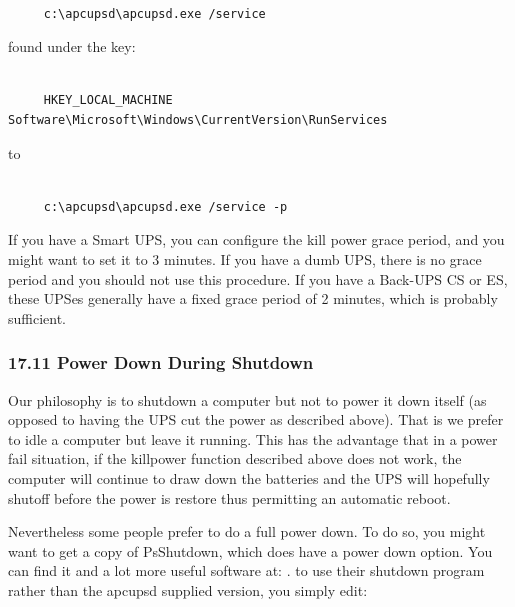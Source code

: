 \footnotesize
\begin{verbatim}
     
     c:\apcupsd\apcupsd.exe /service
\end{verbatim}
\normalsize

found under the key: 

\footnotesize
\begin{verbatim}
     
     HKEY_LOCAL_MACHINE Software\Microsoft\Windows\CurrentVersion\RunServices
\end{verbatim}
\normalsize

to 

\footnotesize
\begin{verbatim}
     
     c:\apcupsd\apcupsd.exe /service -p
\end{verbatim}
\normalsize

If you have a Smart UPS, you can configure the kill power grace period, and
you might want to set it to 3 minutes. If you have a dumb UPS, there is no
grace period and you should not use this procedure. If you have a Back-UPS CS
or ES, these UPSes generally have a fixed grace period of 2 minutes, which is
probably sufficient. 

\label{Power-Down-During-Shutdown}

\subsubsection*{17.11 Power Down During Shutdown}

\label{index-Windows_002c-Power-down-184}
\label{index-Power-down_002c-Windows-185}
Our philosophy is to shutdown a computer but not to power it down itself (as
opposed to having the UPS cut the power as described above). That is we prefer
to idle a computer but leave it running. This has the advantage that in a
power fail situation, if the killpower function described above does not work,
the computer will continue to draw down the batteries and the UPS will
hopefully shutoff before the power is restore thus permitting an automatic
reboot.  

Nevertheless some people prefer to do a full power down. To do so, you might
want to get a copy of PsShutdown, which does have a power down option. You can
find it and a lot more useful software at: 
. to use their shutdown program
rather than the apcupsd supplied version, you simply edit: 


